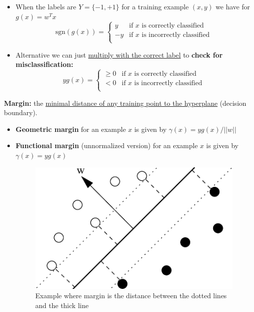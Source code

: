 \documentclass[12pt, a4paper]{article}
\begin{document}
\begin{itemize}
  \item When the labels are $Y = \{-1, +1\}$ for a training example $(x, y)$ we have for $g(x) = w^T x$
  $$
  \text{sgn}(g(x)) =
  \begin{cases}
    y & \text{if $x$ is correctly classified} \\
    -y & \text{if $x$ is incorrectly classified} \\
  \end{cases}
  $$
  \item Alternative we can just \uline{multiply with the correct label} to \textbf{check for misclassification:}
  $$
  yg(x) =
  \begin{cases}
    \geq 0 & \text{if $x$ is correctly classified} \\
    < 0 & \text{if $x$ is incorrectly classified} \\
  \end{cases}
  $$
\end{itemize}

\textbf{Margin:} the \uline{minimal distance of any training point to the hyperplane} (decision boundary).
\begin{itemize}
  \item \textbf{Geometric margin} for an example $x$ is given by $\gamma(x) = yg(x) / ||w||$
  \item \textbf{Functional margin} (unnormalized version) for an example $x$ is given by $\gamma(x) = yg(x)$
  \begin{figure}[H]
    \centering  %
      \includegraphics[width=0.6\columnwidth]{images/margin.png}
      \caption{Example where margin is the distance between the dotted lines and the thick line}
      \label{fig:margin}
  \end{figure}
\end{itemize}
\end{document}
